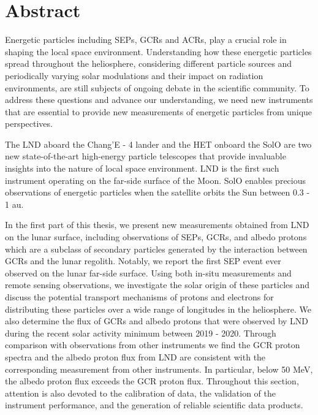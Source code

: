 \chapter*{Abstract}
Energetic particles including \acp{SEP}, \acp{GCR} and \acp{ACR}, play a crucial role in shaping the local space environment. Understanding how these energetic particles spread throughout the heliosphere, considering different particle sources and periodically varying solar modulations and their impact on radiation environments, are still subjects of ongoing debate in the scientific community. To address these questions and advance our understanding, we need new instruments that are essential to provide new measurements of energetic particles from unique perspectives.

The \ac{LND} aboard the Chang'E - 4 lander and the \ac{HET} onboard the \ac{SolO} are two new state-of-the-art high-energy particle telescopes that provide invaluable insights into the nature of local space environment. \ac{LND} is the first such instrument operating on the far-side surface of the Moon. \ac{SolO} enables precious observations of energetic particles when the satellite orbits the Sun between 0.3 - 1 au.

In the first part of this thesis, we present new measurements obtained from \ac{LND} on the lunar surface, including observations of \acp{SEP}, \acp{GCR}, and albedo protons which are a subclass of secondary particles generated by the interaction between \acp{GCR} and the lunar regolith. Notably, we report the first \ac{SEP} event ever observed on the lunar far-side surface. Using both in-situ measurements and remote sensing observations, we investigate the solar origin of these particles and discuss the potential transport mechanisms of protons and electrons for distributing these particles over a wide range of longitudes in the heliosphere. We also determine the flux of \acp{GCR} and albedo protons that were observed by \ac{LND} during the recent solar activity minimum between 2019 - 2020. Through comparison with observations from other instruments
we find the \ac{GCR} proton spectra and the albedo proton flux from \ac{LND} are consistent with the corresponding measurement from other instruments. In particular, below 50 MeV, the albedo proton ﬂux exceeds the \ac{GCR} proton ﬂux.
Throughout this section, attention is also devoted to the calibration of data, the validation of the instrument performance, and the generation of reliable scientific data products.

